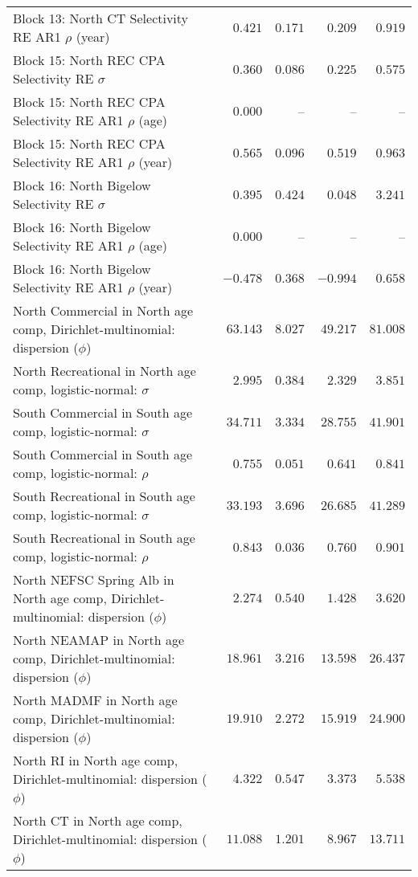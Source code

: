 \documentclass[
]{article}
\begin{document}
\begin{landscape}
\begin{longtable}[t]{lrrrr}
Block 13: North CT Selectivity RE AR1 $\rho$ (year) & $0.421$ & $0.171$ & $0.209$ & $0.919$\\
\addlinespace
Block 15: North REC CPA Selectivity RE $\sigma$ & $0.360$ & $0.086$ & $0.225$ & $0.575$\\
Block 15: North REC CPA Selectivity RE AR1 $\rho$ (age) & $0.000$ & -- & -- & --\\
Block 15: North REC CPA Selectivity RE AR1 $\rho$ (year) & $0.565$ & $0.096$ & $0.519$ & $0.963$\\
Block 16: North Bigelow Selectivity RE $\sigma$ & $0.395$ & $0.424$ & $0.048$ & $3.241$\\
Block 16: North Bigelow Selectivity RE AR1 $\rho$ (age) & $0.000$ & -- & -- & --\\
\addlinespace
Block 16: North Bigelow Selectivity RE AR1 $\rho$ (year) & $-0.478$ & $0.368$ & $-0.994$ & $0.658$\\
North Commercial in North age comp, Dirichlet-multinomial: dispersion ($\phi$) & $63.143$ & $8.027$ & $49.217$ & $81.008$\\
North Recreational in North age comp, logistic-normal: $\sigma$ & $2.995$ & $0.384$ & $2.329$ & $3.851$\\
South Commercial in South age comp, logistic-normal: $\sigma$ & $34.711$ & $3.334$ & $28.755$ & $41.901$\\
South Commercial in South age comp, logistic-normal: $\rho$ & $0.755$ & $0.051$ & $0.641$ & $0.841$\\
\addlinespace
South Recreational in South age comp, logistic-normal: $\sigma$ & $33.193$ & $3.696$ & $26.685$ & $41.289$\\
South Recreational in South age comp, logistic-normal: $\rho$ & $0.843$ & $0.036$ & $0.760$ & $0.901$\\
North NEFSC Spring Alb in North age comp, Dirichlet-multinomial: dispersion ($\phi$) & $2.274$ & $0.540$ & $1.428$ & $3.620$\\
North NEAMAP in North age comp, Dirichlet-multinomial: dispersion ($\phi$) & $18.961$ & $3.216$ & $13.598$ & $26.437$\\
North MADMF in North age comp, Dirichlet-multinomial: dispersion ($\phi$) & $19.910$ & $2.272$ & $15.919$ & $24.900$\\
\addlinespace
North RI in North age comp, Dirichlet-multinomial: dispersion ($\phi$) & $4.322$ & $0.547$ & $3.373$ & $5.538$\\
North CT in North age comp, Dirichlet-multinomial: dispersion ($\phi$) & $11.088$ & $1.201$ & $8.967$ & $13.711$\\

\end{longtable}
\end{landscape}
\end{document}
